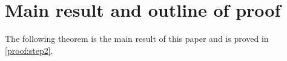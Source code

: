 \documentclass[11pt]{article}
\theoremstyle{definition}
\numberwithin{theorem}{section}
\numberwithin{equation}{section}
\def\D{\mathbb{D}}
\renewcommand{\tilde}{\widetilde}
\renewcommand{\epsilon}{\varepsilon}
\newcommand{\bfU}{{\boldsymbol U}}
\newcommand{\noteH}[1]{\textcolor{blue}{{\textbf{Hana:} #1}}}
\newcommand{\noteW}[1]{\textcolor{purple}{{\textbf{Weilin:} #1}}}
\numberwithin{equation}{section}
\begin{document}


		
		
		
		
		
		

\section{Main result and outline of proof}
\label{sec:outline} 


The following theorem is the main result of this paper and is proved in \cref{proof:step2}.
\end{document}
